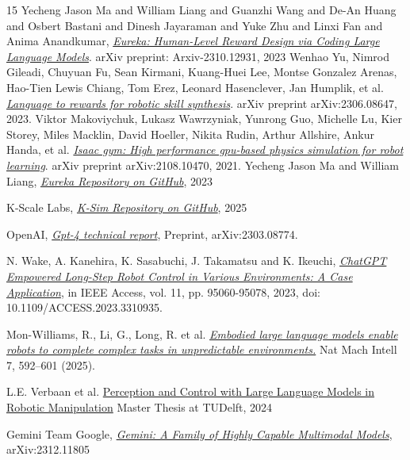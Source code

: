 \documentclass[10pt,twocolumn]{article}
\begin{document}
\begin{thebibliography}{15}
Yecheng Jason Ma and William Liang and Guanzhi Wang and De-An Huang and Osbert Bastani and Dinesh Jayaraman and Yuke Zhu and Linxi Fan and Anima Anandkumar, \href{https://arxiv.org/abs/2310.12931}{\emph{Eureka: Human-Level Reward Design via Coding Large Language Models}}. arXiv preprint: Arxiv-2310.12931, 2023
Wenhao Yu, Nimrod Gileadi, Chuyuan Fu, Sean Kirmani, Kuang-Huei Lee, Montse Gonzalez Arenas, Hao-Tien Lewis Chiang, Tom Erez, Leonard Hasenclever, Jan Humplik, et al. \href{https://arxiv.org/abs/2306.08647}{\emph{Language to rewards for robotic skill synthesis}}. arXiv preprint arXiv:2306.08647, 2023.
Viktor Makoviychuk, Lukasz Wawrzyniak, Yunrong Guo, Michelle Lu, Kier Storey, Miles Macklin,
David Hoeller, Nikita Rudin, Arthur Allshire, Ankur Handa, et al. \href{https://arxiv.org/pdf/2108.10470}{\emph{Isaac gym: High performance
gpu-based physics simulation for robot learning}}. arXiv preprint arXiv:2108.10470, 2021.
Yecheng Jason Ma and William Liang, \href{https://github.com/eureka-research/Eureka}{\emph{Eureka Repository on GitHub}}, 2023

K-Scale Labs, \href{https://github.com/kscalelabs/ksim}{\emph{K-Sim Repository on GitHub}}, 2025

OpenAI,
\href{https://arxiv.org/abs/2303.08774}{\emph{Gpt-4 technical report}},
Preprint,
arXiv:2303.08774.

N. Wake, A. Kanehira, K. Sasabuchi, J. Takamatsu and K. Ikeuchi,
\href{https://ieeexplore.ieee.org/document/10235949}{\emph{ChatGPT Empowered Long-Step Robot Control in Various Environments: A Case Application}},
in IEEE Access, vol. 11, pp. 95060-95078, 2023,
doi: 10.1109/ACCESS.2023.3310935.

Mon-Williams, R., Li, G., Long, R. et al.
\href{https://doi.org/10.1038/s42256-025-01005-x}{\emph{Embodied large language models enable robots to complete complex tasks in unpredictable environments.}}
Nat Mach Intell 7, 592–601 (2025).

L.E. Verbaan et al.
\href{https://repository.tudelft.nl/record/uuid:2944a8e1-0a54-492b-af63-193a7ac11db8#title}{Perception and Control with Large Language Models in Robotic Manipulation}
Master Thesis at TUDelft, 2024

Gemini Team Google,
\href{https://arxiv.org/abs/2312.11805}{\emph{Gemini: A Family of Highly Capable Multimodal Models}},
arXiv:2312.11805


\end{thebibliography}
\end{document}
